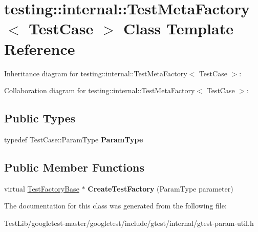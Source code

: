 \hypertarget{classtesting_1_1internal_1_1TestMetaFactory}{}\section{testing\+:\+:internal\+:\+:Test\+Meta\+Factory$<$ Test\+Case $>$ Class Template Reference}
\label{classtesting_1_1internal_1_1TestMetaFactory}


Inheritance diagram for testing\+:\+:internal\+:\+:Test\+Meta\+Factory$<$ Test\+Case $>$\+:


Collaboration diagram for testing\+:\+:internal\+:\+:Test\+Meta\+Factory$<$ Test\+Case $>$\+:
\subsection*{Public Types}
\begin{DoxyCompactItemize}
\item 
\mbox{\label{classtesting_1_1internal_1_1TestMetaFactory_a9c12e442b4389381b948ed669fcf0f84}} 
typedef Test\+Case\+::\+Param\+Type {\bfseries Param\+Type}
\end{DoxyCompactItemize}
\subsection*{Public Member Functions}
\begin{DoxyCompactItemize}
\item 
\mbox{\label{classtesting_1_1internal_1_1TestMetaFactory_ae9f5334c68af309bca8f7ec29d837e38}} 
virtual \hyperlink{classtesting_1_1internal_1_1TestFactoryBase}{Test\+Factory\+Base} $\ast$ {\bfseries Create\+Test\+Factory} (Param\+Type parameter)
\end{DoxyCompactItemize}


The documentation for this class was generated from the following file\+:\begin{DoxyCompactItemize}
\item 
Test\+Lib/googletest-\/master/googletest/include/gtest/internal/gtest-\/param-\/util.\+h\end{DoxyCompactItemize}
